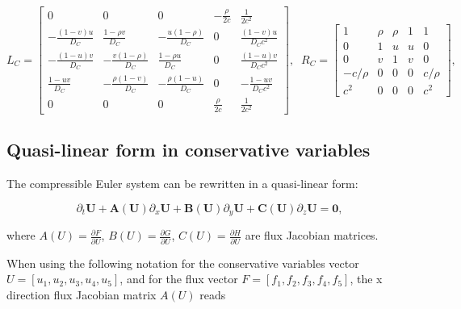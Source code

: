 \documentclass{article}
\begin{document}
\begin{equation}
L_C = \left[
    \begin{array}{ccccc}
      0 & 0 & 0 & -\frac{\rho}{2c} & \frac{1}{2c^2}\\
      -\frac{(1-v)u}{D_C} & \frac{1-\rho v}{D_C} & -\frac{u(1-\rho)}{D_C} & 0 & \frac{(1-v)u}{D_C c^2}\\
      -\frac{(1-u)v}{D_C} & -\frac{v(1-\rho)}{D_C} & \frac{1-\rho u}{D_C} & 0 & \frac{(1-u)v}{D_C c^2}\\
      \frac{1-u v}{D_C} & -\frac{\rho(1-v)}{D_C} & -\frac{\rho(1-u)}{D_C} & 0 & -\frac{1-uv}{D_C c^2}\\
      0 & 0 & 0&  \frac{\rho}{2c} & \frac{1}{2 c^2}
      \end{array}
  \right],\;\;
  R_C = \left[
    \begin{array}{ccccc}
      1       & \rho & \rho & 1 & 1 \\
      0       & 1    & u    & u & 0 \\
      0       & v    & 1    & v & 0 \\
      -c/\rho & 0    & 0    & 0 & c/\rho \\
      c^2     & 0    & 0    & 0 & c^2
    \end{array}
  \right],\;\;
\end{equation}

\subsection{Quasi-linear form in conservative variables}

The compressible Euler system can be rewritten in a quasi-linear form:

\begin{equation}
  \partial_t \mathbf{U} + \mathbf{A(U)} \partial_x \mathbf{U} + \mathbf{B(U)} \partial_y \mathbf{U} + \mathbf{C(U)} \partial_z \mathbf{U} = \mathbf{0},
\end{equation}

where $A(U)=\frac{\partial F}{\partial U}$, $B(U)=\frac{\partial G}{\partial U}$, $C(U)=\frac{\partial H}{\partial U}$ are flux Jacobian matrices.

When using the following notation for the conservative variables vector $U=[u_1, u_2, u_3, u_4, u_5]$, and for the flux vector $F=[f_1, f_2, f_3, f_4, f_5]$, the x direction flux Jacobian matrix $A(U)$ reads
\end{document}
